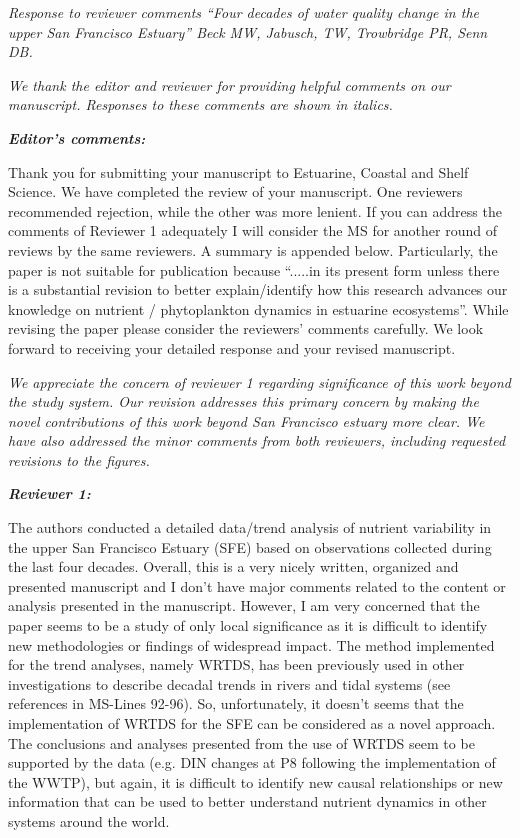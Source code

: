 \documentclass[letterpaper,12pt]{article}
\newcommand{\Bigtxt}[1]{\textbf{\textit{#1}}}
\begin{document}
\raggedright


{\it Response to reviewer comments ``Four decades of water quality change in the upper San Francisco Estuary'' Beck MW, Jabusch, TW, Trowbridge PR, Senn DB.}

{\it We thank the editor and reviewer for providing helpful comments on our manuscript.  Responses to these comments are shown in italics.}

\Bigtxt{Editor's comments:}

Thank you for submitting your manuscript to Estuarine, Coastal and Shelf Science. We have completed the review of your manuscript. One reviewers recommended rejection, while the other was more lenient. If you can address the comments of Reviewer 1 adequately I will consider the MS for another round of reviews by the same reviewers. A summary is appended below. Particularly, the paper is not suitable for publication because ``.....in its present form unless there is a substantial revision to better explain/identify how this research advances our knowledge on nutrient / phytoplankton dynamics in estuarine ecosystems''.  While revising the paper please consider the reviewers' comments carefully. We look forward to receiving your detailed response and your revised manuscript.

{\it We appreciate the concern of reviewer 1 regarding significance of this work beyond the study system.  Our revision addresses this primary concern by making the novel contributions of this work beyond San Francisco estuary more clear.  We have also addressed the minor comments from both reviewers, including requested revisions to the figures.
}

\Bigtxt{Reviewer 1:}

The authors conducted a detailed data/trend analysis of nutrient variability in the upper San Francisco Estuary (SFE) based on observations collected during the last four decades. Overall, this is a very nicely written, organized and presented manuscript and I don't have major comments related to the content or analysis presented in the manuscript. However, I am very concerned that the paper seems to be a study of only local significance as it is difficult to identify new methodologies or findings of widespread impact. The method implemented for the trend analyses, namely WRTDS, has been previously used in other investigations to describe decadal trends in rivers and tidal systems (see references in MS-Lines 92-96). So, unfortunately, it doesn't seems that the implementation of WRTDS for the SFE can be considered as a novel approach. The conclusions and analyses presented from the use of WRTDS seem to be supported by the data (e.g. DIN changes at P8 following the implementation of the WWTP), but again, it is difficult to identify new causal relationships or new information that can be used to better understand nutrient dynamics in other systems around the world.  
\end{document}
